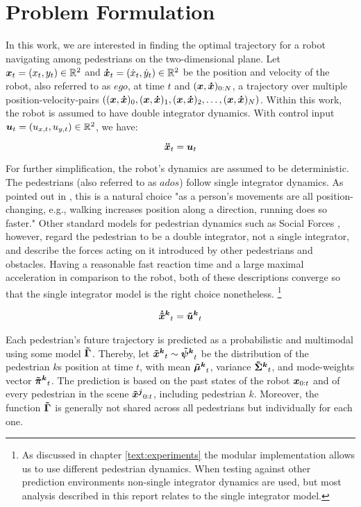 
\section{Problem Formulation}
\label{text:approach/formulation}
In this work, we are interested in finding the optimal trajectory for a robot navigating among pedestrians on the two-dimensional plane. Let $\boldsymbol{x}_t = (x_t, y_t) \in \mathbb{R}^2$ and $\boldsymbol{\dot{x}}_t = (\dot{x}_t, \dot{y}_t) \in \mathbb{R}^2 $ be the position and velocity of the robot, also referred to as $ego$, at time $t$ and $(\boldsymbol{x}, \boldsymbol{\dot{x}})_{0:N}$, a trajectory over multiple position-velocity-pairs $((\boldsymbol{x}, \boldsymbol{\dot{x}})_0, (\boldsymbol{x}, \boldsymbol{\dot{x}})_1, (\boldsymbol{x}, \boldsymbol{\dot{x}})_2, \hdots, (\boldsymbol{x}, \boldsymbol{\dot{x}})_N)$. Within this work, the robot is assumed to have double integrator dynamics. With control input $\boldsymbol{u}_t = (u_{x, t}, u_{y, t}) \in \mathbb{R}^2$, we have: 

\begin{equation}
\boldsymbol{\ddot{x}}_t = \boldsymbol{u}_t
\label{eq:robot_dynamics}
\end{equation}

For further simplification, the robot's dynamics are assumed to be deterministic. 
The pedestrians (also referred to as $ados$) follow single integrator dynamics. As pointed out in \cite{Ivanovic18}, this is a natural choice "as a person's movements are all position-changing, e.g., walking increases position along a direction, running does so faster." Other standard models for pedestrian dynamics such as Social Forces \cite{Helbling1995}, however, regard the pedestrian to be a double integrator, not a single integrator, and describe the forces acting on it introduced by other pedestrians and obstacles. Having a reasonable fast reaction time and a large maximal acceleration in comparison to the robot, both of these descriptions converge so that the single integrator model is the right choice nonetheless. \footnote{As discussed in chapter \ref{text:experiments} the modular implementation allows us to use different pedestrian dynamics. When testing against other prediction environments non-single integrator dynamics are used, but most analysis described in this report relates to the single integrator model.}

\begin{align}
\dxped[k]_t = \uped[k]_t
\label{eq:pedestrian_dynamics}
\end{align}

Each pedestrian's future trajectory is predicted as a probabilistic and multimodal using some model $\distmodel[]$. Thereby, let $\xped[k]_t \sim \dist[k]_t$ be the distribution of the pedestrian $k$s position at time $t$, with mean $\muped[k]_t$, variance $\sigmaped[k]_t$, and mode-weights vector $\piped[k]_t$. The prediction is based on the past states of the robot $\boldsymbol{x}_{0:t}$ and of every pedestrian in the scene $\xped[j]_{0:t}$, including pedestrian $k$. Moreover, the function $\distmodel[]$ is generally not shared across all pedestrians but individually for each one.

